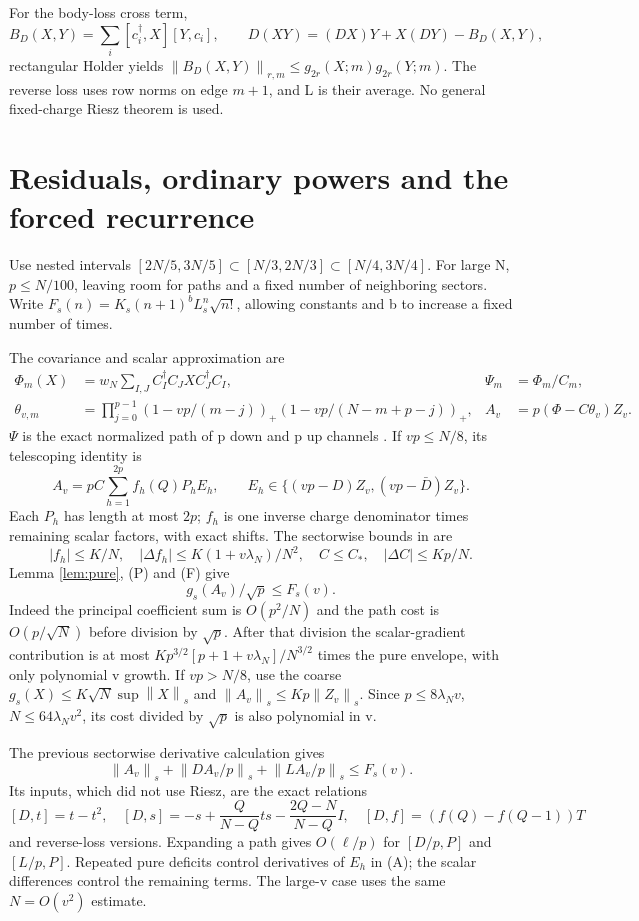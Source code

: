 \documentclass[11pt]{article}
\newcommand{\norm}[1]{\left\lVert#1\right\rVert}
\begin{document}
For the body-loss cross term,
\[
 B_D(X,Y)=\sum_i[c_i^\dagger,X][Y,c_i],\qquad
 D(XY)=(DX)Y+X(DY)-B_D(X,Y),
\]
rectangular Holder yields
$\norm{B_D(X,Y)}_{r,m}\le g_{2r}(X;m)g_{2r}(Y;m)$.
The reverse loss uses row norms on edge $m+1$, and L is their
average. No general fixed-charge Riesz theorem is used.

\section{Residuals, ordinary powers and the forced recurrence}
Use nested intervals
$[2N/5,3N/5]\subset[N/3,2N/3]\subset[N/4,3N/4]$.
For large N, $p\le N/100$, leaving room for paths and a fixed
number of neighboring sectors. Write
$F_s(n)=K_s(n+1)^bL_s^n\sqrt{n!}$, allowing constants and b to
increase a fixed number of times.

The covariance and scalar approximation are
\begin{align*}
 \Phi_m(X)&=w_N\sum_{I,J}C_I^\dagger C_JX C_J^\dagger C_I,
 &\Psi_m&=\Phi_m/C_m,\\
 \theta_{v,m}&=\prod_{j=0}^{p-1}
 (1-vp/(m-j))_+(1-vp/(N-m+p-j))_+,
 &A_v&=p(\Phi-C\theta_v)Z_v.
\end{align*}
$\Psi$ is the exact normalized path of p down and p up channels
\cite{operator}. If $vp\le N/8$, its telescoping identity is
\[
 A_v=pC\sum_{h=1}^{2p}f_h(Q)P_hE_h,\qquad
 E_h\in\{(vp-D)Z_v,(vp-\bar D)Z_v\}. \tag{A}
\]
Each $P_h$ has length at most $2p$; $f_h$ is one inverse charge
denominator times remaining scalar factors, with exact shifts.
The sectorwise bounds in \cite{charged} are
\[
 |f_h|\le K/N,\quad |\Delta f_h|\le K(1+v\lambda_N)/N^2,
 \quad C\le C_*,\quad |\Delta C|\le Kp/N.
\]
Lemma \ref{lem:pure}, (P) and (F) give
\[
 g_s(A_v)/\sqrt p\le F_s(v). \tag{A1}
\]
Indeed the principal coefficient sum is $O(p^2/N)$ and the
path cost is $O(p/\sqrt N)$ before division by $\sqrt p$.
After that division the scalar-gradient contribution is at most
$Kp^{3/2}[p+1+v\lambda_N]/N^{3/2}$ times the pure envelope,
with only polynomial v growth. If $vp>N/8$, use the coarse
$g_s(X)\le K\sqrt N\sup\norm X_s$ and
$\norm{A_v}_s\le Kp\norm{Z_v}_s$. Since
$p\le8\lambda_Nv$, $N\le64\lambda_Nv^2$, its cost divided by
$\sqrt p$ is also polynomial in v.

The previous sectorwise derivative calculation gives
\[
 \norm{A_v}_s+\norm{DA_v/p}_s+\norm{LA_v/p}_s\le F_s(v). \tag{A2}
\]
Its inputs, which did not use Riesz, are the exact relations
\[
 [D,t]=t-t^2,\quad
 [D,s]=-s+\frac Q{N-Q}ts-\frac{2Q-N}{N-Q}I,\quad
 [D,f]=(f(Q)-f(Q-1))T
\]
and reverse-loss versions. Expanding a path gives
$O(\ell/p)$ for $[D/p,P]$ and $[L/p,P]$. Repeated pure
deficits control derivatives of $E_h$ in (A); the scalar
differences control the remaining terms. The large-v case uses
the same $N=O(v^2)$ estimate.
\end{document}
